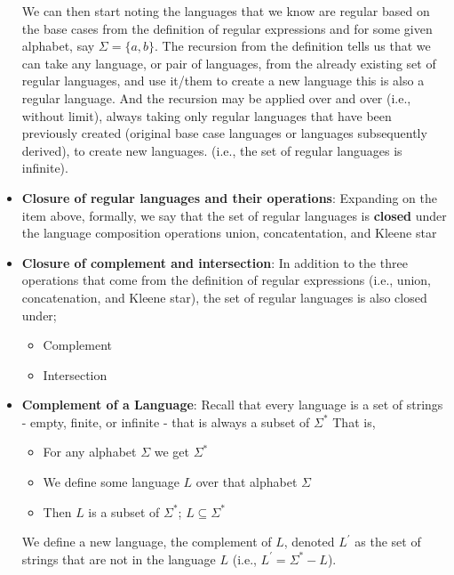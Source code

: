 \documentclass{report}
\begin{document}
\begin{itemize}
            \bigbreak \noindent 
            We can then start noting the languages that we know are regular based on the base cases from the definition of regular expressions and for some given alphabet, say $\Sigma = \{a, b\}$.
            \bigbreak \noindent 
            The recursion from the definition tells us that we can take any language, or pair of languages, from the already existing set of regular languages, and use it/them to create a new language this is also a regular language. And the recursion may be applied over and over (i.e., without limit), always taking only regular languages that have been previously created (original base case languages or languages subsequently derived), to create new languages. (i.e., the set of regular languages is infinite).
            \bigbreak \noindent 
        \item \textbf{Closure of regular languages and their operations}: Expanding on the item above, formally, we say that the set of regular languages is \textbf{closed} under the language composition operations union, concatentation, and Kleene star
        \item \textbf{Closure of complement and intersection}: In addition to the three operations that come from the definition of regular expressions (i.e., union, concatenation, and Kleene star), the set of regular languages is also closed under;
            \begin{itemize}
                \item Complement
                \item Intersection
            \end{itemize}
        \item \textbf{Complement of a Language}: Recall that every language is a set of strings - empty, finite, or infinite - that is always a subset of $\Sigma^{*}$
            \bigbreak \noindent 
            That is,
            \begin{itemize}
                \item For any alphabet $\Sigma$ we get $\Sigma^{*} $
                \item We define some language $L$ over that alphabet $\Sigma$
                \item Then $L$ is a subset of $\Sigma^{*}$; $L \subseteq \Sigma^{*}$
            \end{itemize}
            \bigbreak \noindent 
            We define a new language, the complement of $L$, denoted $L^{\prime}$ as the set of strings that are not in the language $L$ (i.e., $L^{\prime} = \Sigma^{*}  - L$).

\end{itemize}
\end{document}
